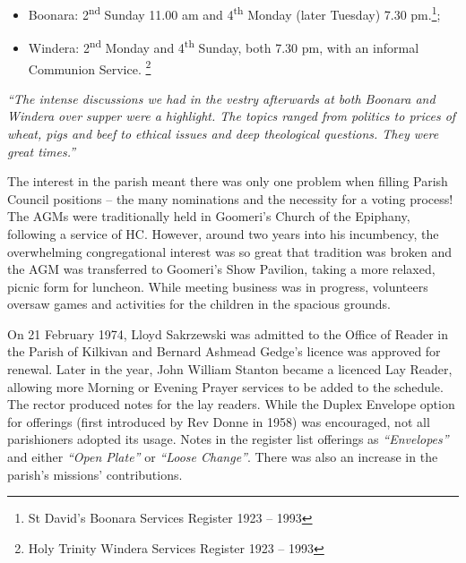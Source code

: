 \begin{itemize}

\item

  Boonara: 2\textsuperscript{nd} Sunday 11.00 am and 4\textsuperscript{th} Monday (later Tuesday) 7.30 pm.\footnote{St David's Boonara Services Register 1923 -- 1993};
\item

  Windera: 2\textsuperscript{nd} Monday and 4\textsuperscript{th} Sunday, both 7.30 pm, with an informal Communion Service. \footnote{Holy Trinity Windera Services Register 1923 -- 1993}
\end{itemize}



\emph{``The intense discussions we had in the vestry afterwards at both Boonara and Windera over supper were a highlight. The topics ranged from politics to prices of wheat, pigs and beef to ethical issues and deep theological questions. They were great times.''}



The interest in the parish meant there was only one problem when filling Parish Council positions -- the many nominations and the necessity for a voting process! The AGMs were traditionally held in Goomeri's Church of the Epiphany, following a service of HC. However, around two years into his incumbency, the overwhelming congregational interest was so great that tradition was broken and the AGM was transferred to Goomeri's Show Pavilion, taking a more relaxed, picnic form for luncheon. While meeting business was in progress, volunteers oversaw games and activities for the children in the spacious grounds.



On 21 February 1974, Lloyd Sakrzewski was admitted to the Office of Reader in the Parish of Kilkivan and Bernard Ashmead Gedge's licence was approved for renewal. Later in the year, John William Stanton became a licenced Lay Reader, allowing more Morning or Evening Prayer services to be added to the schedule. The rector produced notes for the lay readers. While the Duplex Envelope option for offerings (first introduced by Rev Donne in 1958) was encouraged, not all parishioners adopted its usage. Notes in the register list offerings as \emph{``Envelopes''} and either \emph{``Open Plate''} or \emph{``Loose Change''}. There was also an increase in the parish's missions' contributions.









